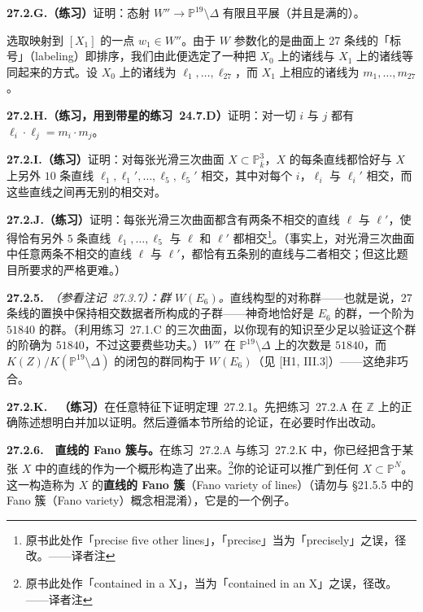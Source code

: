 \textbf{27.2.G.（练习）}\quad 证明：态射 $W''\to\mathbb{P}^{19}\setminus\Delta$ 有限且平展（并且是满的）。

选取映射到 $[X_{1}]$ 的一点 $w_{1}\in W''$。由于 $W$ 参数化的是曲面上 27 条线的「标号」（labeling）即排序，我们由此便选定了一种把 $X_{0}$ 上的诸线与 $X_{1}$ 上的诸线等同起来的方式。设 $X_{0}$ 上的诸线为 $\ell_{1},\dots,\ell_{27}$，而 $X_{1}$ 上相应的诸线为 $m_{1},\dots,m_{27}$。

\textbf{27.2.H.（练习，用到带星的\mbox{练习~24.7.D}）}\quad 证明：对一切 $i$ 与 $j$ 都有 $\ell_{i}\cdot\ell_{j}=m_{i}\cdot m_{j}$。

\textbf{27.2.I.（练习）}\quad 证明：对每张光滑三次曲面 $X\subset\mathbb{P}^{3}_{\bar{k}}$，$X$ 的每条直线都恰好与 $X$ 上另外 $10$ 条直线 $\ell_{1},\ell_{1}',\dots,\ell_{5},\ell_{5}'$ 相交，其中对每个 $i$，$\ell_{i}$ 与 $\ell_{i}'$ 相交，而这些直线之间再无别的相交对。

\textbf{27.2.J.（练习）}\quad 证明：每张光滑三次曲面都含有两条不相交的直线 $\ell$ 与 $\ell'$，使得恰有另外 $5$ 条直线 $\ell_{1},\dots,\ell_{5}$ 与 $\ell$ 和 $\ell'$ 都相交\footnote{原书此处作「precise five other lines」，「precise」当为「precisely」之误，径改。——译者注}。（事实上，对光滑三次曲面中任意两条不相交的直线 $\ell$ 与 $\ell'$，都恰有五条别的直线与二者相交；但这比题目所要求的严格更难。）

\textbf{27.2.5.}\ \emph{\trhRemark（参看\mbox{注记~27.3.7}）：\trWeyl{}群 $W(E_{6})$。}\quad 直线构型的对称群——也就是说，27 条线的置换中保持相交数据者所构成的子群——神奇地恰好是 $E_{6}$ 的\trWeyl{}群，一个阶为 $51840$ 的群。（利用\mbox{练习~27.1.C} 的\trFermat{}三次曲面，以你现有的知识至少足以验证这个群的阶确为 $51840$，不过这要费些功夫。）$W''$ 在 $\mathbb{P}^{19}\setminus\Delta$ 上的次数是 $51840$，而 $K(Z)/K(\mathbb{P}^{19}\setminus\Delta)$ 的\trGalois{}闭包的\trGalois{}群同构于 $W(E_{6})$（见 [H1, III.3]）——这绝非巧合。

\textbf{27.2.K.}\ \extrahard\ \textbf{（练习）}\quad 在任意特征下证明\mbox{定理~27.2.1}。先把\mbox{练习~27.2.A} 在 $\mathbb{Z}$ 上的正确陈述想明白并加以证明。然后遵循本节所给的论证，在必要时作出改动。

\textbf{27.2.6.}\ \hard\ \textbf{直线的 Fano 簇与\trHilbertScheme。}\quad 在\mbox{练习~27.2.A} 与\mbox{练习~27.2.K} 中，你已经把含于某张 $X$ 中的直线的\trModuliSpace{}作为一个概形构造了出来。\footnote{原书此处作「contained in a X」，当为「contained in an X」之误，径改。——译者注}你的论证可以推广到任何 $X\subset\mathbb{P}^{N}$。这一构造称为 $X$ 的\textbf{直线的 Fano 簇}（Fano variety of lines）（请勿与 \S21.5.5 中的 Fano 簇（Fano variety）概念相混淆），它是\trHilbertScheme{}的一个例子。
